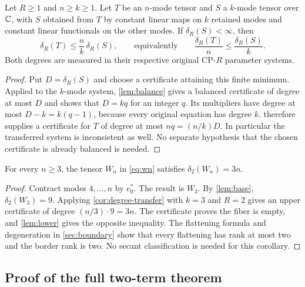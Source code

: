 \begin{corollary}\label{cor:degree-transfer}
Let $R\ge1$ and $n\ge k\ge1$. Let $T$ be an $n$-mode tensor and $S$ a $k$-mode tensor over $\mathbb{C}$, with $S$ obtained from $T$ by constant linear maps on $k$ retained modes and constant linear functionals on the other modes. If $\delta_R(S)<\infty$, then
\begin{equation}\label{eq:degree-transfer}
 \delta_R(T)\le\frac{n}{k}\,\delta_R(S),
 \qquad\text{equivalently}\qquad
 \frac{\delta_R(T)}{n}\le\frac{\delta_R(S)}{k}.
\end{equation}
Both degrees are measured in their respective original CP-$R$ parameter systems.
\end{corollary}

\begin{proof}
Put $D=\delta_R(S)$ and choose a certificate attaining this finite minimum. Applied to the $k$-mode system, \cref{lem:balance} gives a balanced certificate of degree at most $D$ and shows that $D=kq$ for an integer $q$. Its multipliers have degree at most $D-k=k(q-1)$, because every original equation has degree $k$.  therefore supplies a certificate for $T$ of degree at most $nq=(n/k)D$. In particular the transferred system is inconsistent as well. No separate hypothesis that the chosen certificate is already balanced is needed.
\end{proof}

\begin{corollary}\label{cor:wn}
For every $n\ge3$, the tensor $W_n$ in \cref{eq:wn} satisfies $\delta_2(W_n)=3n$.
\end{corollary}

\begin{proof}
Contract modes $4,\ldots,n$ by $e_0^*$. The result is $W_3$. By \cref{lem:base}, $\delta_2(W_3)=9$. Applying \cref{cor:degree-transfer} with $k=3$ and $R=2$ gives an upper certificate of degree $(n/3)\cdot9=3n$. The certificate proves the fiber is empty, and \cref{lem:lower} gives the opposite inequality. The flattening formula and degeneration in \cref{sec:boundary} show that every flattening has rank at most two and the border rank is two. No secant classification is needed for this corollary.
\end{proof}

\subsection{Proof of the full two-term theorem}

